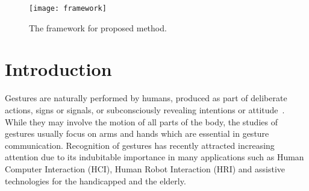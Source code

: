 \documentclass[10pt, a4paper, conference]{IEEEtran}
\begin{document}
\begin{figure*}[t]
\begin{center}{\texttt{[image: framework]}}
\end{center}
\caption{The framework for proposed method.}
\label{fig:framework}
\end{figure*}


\section{Introduction}

Gestures are naturally performed by humans, produced as part of deliberate actions, signs or signals, or subconsciously revealing intentions or attitude~\cite{escalera2016challenges}. While they may involve the motion of all parts of the body, the studies of gestures usually focus on arms and hands which are essential in gesture communication. Recognition of gestures has recently attracted increasing attention due to its indubitable importance in many applications such as Human Computer Interaction (HCI), Human Robot Interaction (HRI) and assistive technologies for the handicapped and the elderly.
\end{document}
